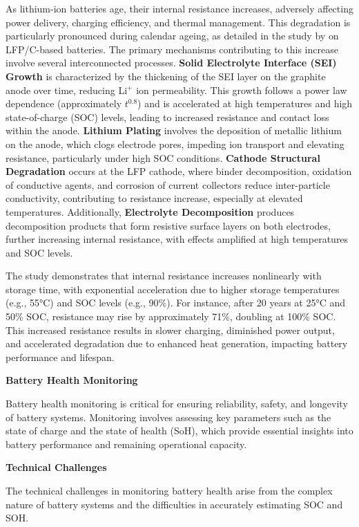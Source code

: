 As lithium-ion batteries age, their internal resistance increases, adversely affecting power delivery, charging efficiency, and thermal management. This degradation is particularly pronounced during calendar ageing, as detailed in the study by \cite{stroe_degradation_2018} on LFP/C-based batteries. The primary mechanisms contributing to this increase involve several interconnected processes. \textbf{Solid Electrolyte Interface (SEI) Growth} is characterized by the thickening of the SEI layer on the graphite anode over time, reducing Li$^+$ ion permeability. This growth follows a power law dependence (approximately $t^{0.8}$) and is accelerated at high temperatures and high state-of-charge (SOC) levels, leading to increased resistance and contact loss within the anode. \textbf{Lithium Plating} involves the deposition of metallic lithium on the anode, which clogs electrode pores, impeding ion transport and elevating resistance, particularly under high SOC conditions. \textbf{Cathode Structural Degradation} occurs at the LFP cathode, where binder decomposition, oxidation of conductive agents, and corrosion of current collectors reduce inter-particle conductivity, contributing to resistance increase, especially at elevated temperatures. Additionally, \textbf{Electrolyte Decomposition} produces decomposition products that form resistive surface layers on both electrodes, further increasing internal resistance, with effects amplified at high temperatures and SOC levels.

The study demonstrates that internal resistance increases nonlinearly with storage time, with exponential acceleration due to higher storage temperatures (e.g., 55°C) and SOC levels (e.g., 90\%). For instance, after 20 years at 25°C and 50\% SOC, resistance may rise by approximately 71\%, doubling at 100\% SOC. This increased resistance results in slower charging, diminished power output, and accelerated degradation due to enhanced heat generation, impacting battery performance and lifespan.

\textbf{Battery Health Monitoring}

Battery health monitoring is critical for ensuring reliability, safety, and longevity of battery systems. Monitoring involves assessing key parameters such as the state of charge and the state of health (SoH), which provide essential insights into battery performance and remaining operational capacity.

\textbf{Technical Challenges}

The technical challenges in monitoring battery health arise from the complex nature of battery systems and the difficulties in accurately estimating SOC and SOH.

